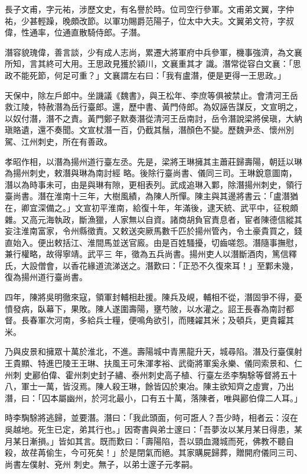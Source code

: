 \begin{pinyinscope}
 長子文甫，字元祐，涉歷文史，有名譽於時。位司空行參軍。文甫弟文翼，字仲祐，少甚輕躁，晚頗改節。以軍功賜爵范陽子，位太中大夫。文翼弟文符，字叔偉，性通率，位通直散騎侍郎。子潛。



 潛容貌瑰偉，善言談，少有成人志尚，累遷大將軍府中兵參軍，機事強濟，為文襄所知，言其終可大用。王思政見獲於潁川，文襄重其才
 識。潛常從容白文襄：「思政不能死節，何足可重？」文襄謂左右曰：「我有盧潛，便是更得一王思政。」



 天保中，除左戶郎中。坐譏議《魏書》，與王松年、李庶等俱被禁止。會清河王岳救江陵，特赦潛為岳行臺郎。還，歷中書、黃門侍郎。為奴誣告謀反，文宣明之，以奴付潛，潛不之責。黃門鄭子默奏潛從清河王岳南討，岳令潛說梁將侯瑱，大納瑱賂遺，還不奏聞。文宣杖潛一百，仍截其鬚，潛顏色不變。歷魏尹丞、懷州別駕、江州刺史，所在有善政。



 孝昭作相，以潛為揚州道行臺左丞。先是，梁將王琳擁其主蕭莊歸壽陽，朝廷以琳為揚州刺史，敕潛與琳為南討經
 略。後除行臺尚書、儀同三司。王琳銳意圖南，潛以為時事未可，由是與琳有隙，更相表列。武成追琳入鄴，除潛揚州刺史，領行臺尚書。潛在淮南十三年，大樹風績，為陳人所憚。陳主與其邊將書云：「盧潛猶在，卿宜深備之。」文宣初平淮南，給復十年，年滿後，逮天統、武平中，征稅頗雜。又高元海執政，斷漁獵，人家無以自資。諸商胡負官責息者，宦者陳德信縱其妄注淮南富家，令州縣徵責。又敕送突厥馬數千匹於揚州管內，令土豪貴買之，錢直始入。便出敕括江、淮間馬並送官廄。由是百姓騷擾，切齒嗟怨。潛隨事撫慰，兼行權略，故得寧靖。武平三
 年，徵為五兵尚書。揚州吏人以潛斷酒肉，篤信釋氏，大設僧會，以香花緣道流涕送之。潛歎曰：「正恐不久復來耳！」至鄴未幾，復為揚州道行臺尚書。



 四年，陳將吳明徹來寇，領軍封輔相赴援。陳兵及峴，輔相不從，潛固爭不得，憂憤發病，臥幕下，果敗。陳人遂圍壽陽，壅芍陂，以水灌之。詔王長春為南討都督。長春軍次河南，多給兵士糧，便鳴角欲引，而賤糴其米；及頓兵，更貴糶其米。



 乃與皮景和擁眾十萬於淮北，不進。壽陽城中青黑龍升天，城尋陷。潛及行臺僕射王貴顯、特進巴陵王王琳、扶風王可朱渾孝裕、武衛將軍奚永樂、儀同索景和、仁州刺
 史酈伯偉、霍州刺史封子繡、泰州刺史高子植、行臺左丞李騊駼等督將五十八，軍士一萬，皆沒焉。陳人殺王琳，餘皆囚於東冶。陳主欲知齊之虛實，乃出潛，曰：「囚本屬幽州，於河北最小，口有五十萬，落陳者，唯與酈伯偉二人耳。」



 時李騊駼將逃歸，並要潛。潛曰：「我此頭面，何可誑人？吾少時，相者云：沒在吳越地。死生已定，弟其行也。」因寄書與弟士邃曰：「吾夢汝以某月某日得患，某月某日漸損。」皆如其言。既而歎曰：「壽陽陷，吾以頸血濺城而死，佛教不聽自殺，故荏苒偷生，今可死矣！」於是閉氣而絕。其家購屍歸葬，贈開府儀同三司、尚書左僕射、兗州
 刺史。無子，以弟士邃子元孝嗣。




\end{pinyinscope}
